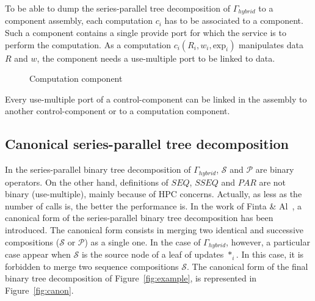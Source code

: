 \medskip
To be able to dump the series-parallel tree decomposition of $\Gamma_{hybrid}$ to a component assembly, each computation $c_i$ has to be associated to a component. Such a component contains a single provide port for which the service is to perform the computation. As a computation $c_i(R_i,w_i,\text{exp}_i)$ manipulates data $R$ and $w$, the component needs a use-multiple port to be linked to data.

\begin{figure}[h!]
\captionsetup[subfigure]{labelformat=empty}
\begin{center}
  \caption{Computation component}
\label{fig:control}
\end{center}
\end{figure}

Every use-multiple port of a control-component can be linked in the assembly to another control-component or to a computation component.

\subsection{Canonical series-parallel tree decomposition}
In the series-parallel binary tree decomposition of $\Gamma_{hybrid}$, $\mathcal{S}$ and $\mathcal{P}$ are binary operators. On the other hand, definitions of $SEQ$, $SSEQ$ and $PAR$ are not binary (use-multiple), mainly because of HPC concerns. Actually, as less as the number of calls is, the better the performance is. In the work of Finta \& Al~\cite{Finta:1996:SUS:235643.235649}, a canonical form of the series-parallel binary tree decomposition has been introduced. The canonical form consists in merging two identical and successive compositions ($\mathcal{S}$ or $\mathcal{P}$) as a single one. In the case of $\Gamma_{hybrid}$, however, a particular case appear when $\mathcal{S}$ is the source node of a leaf of updates $*_i$. In this case, it is forbidden to merge two sequence compositions $\mathcal{S}$. The canonical form of the final binary tree decomposition of Figure~\ref{fig:example}, is represented in Figure~\ref{fig:canon}.

